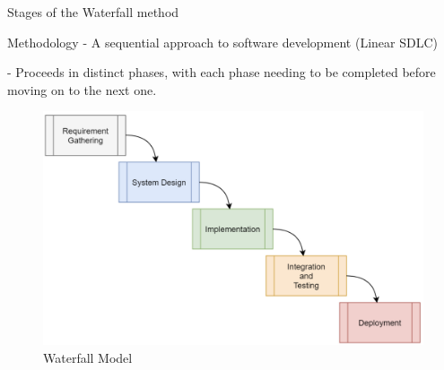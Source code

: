 \begin{frame}{Stages of the Waterfall method}

    \begin{block}{Methodology}
        - A sequential approach to software development (Linear SDLC) 
        
        - Proceeds in distinct phases, with each phase needing to be completed before moving on to the next one.
    \end{block}   

    \begin{figure}
    \centering
    \includegraphics[scale=0.2]{images/illustrate/model.png}
    \caption{Waterfall Model}
    \end{figure}
    
\end{frame}